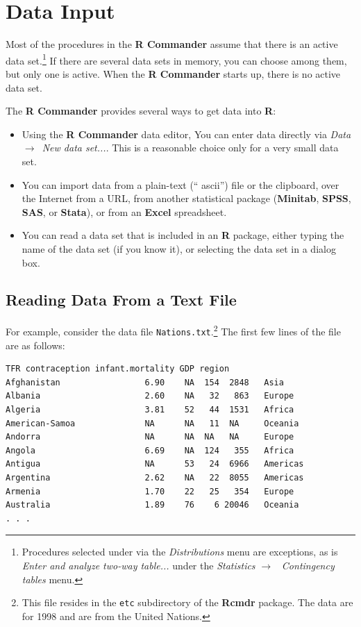 \documentclass{article}%
\begin{document}
\section{Data Input}

Most of the procedures in the \textbf{R Commander} assume that there is an
active data set.\footnote{Procedures selected under via the
\emph{Distributions} menu are exceptions, as is \emph{Enter and analyze
two-way table...} under the \emph{Statistics }$\longrightarrow$%
\emph{\ Contingency tables} menu.} If there are several data sets in memory,
you can choose among them, but only one is active. When the \textbf{R
Commander} starts up, there is no active data set.

The \textbf{R Commander} provides several ways to get data into \textbf{R}:

\begin{itemize}
\item Using the \textbf{R Commander} data editor, You can enter data directly
via \emph{Data }$\longrightarrow$\emph{\ New data set...}. This is a
reasonable choice only for a very small data set.

\item You can import data from a plain-text (\textquotedblleft
ascii\textquotedblright) file or the clipboard, over the Internet from a URL,
from another statistical package (\textbf{Minitab}, \textbf{SPSS},
\textbf{SAS}, or \textbf{Stata}), or from an \textbf{Excel} spreadsheet.

\item You can read a data set that is included in an \textbf{R} package,
either typing the name of the data set (if you know it), or selecting the data
set in a dialog box.
\end{itemize}

\subsection{Reading Data From a Text File}

For example, consider the data file \texttt{Nations.txt}.\footnote{This file
resides in the \texttt{etc} subdirectory of the \textbf{Rcmdr} package. The
data are for 1998 and are from the United Nations.} The first few lines of the
file are as follows:
\begin{verbatim}
TFR contraception infant.mortality GDP region
Afghanistan                 6.90    NA  154  2848   Asia
Albania                     2.60    NA   32   863   Europe
Algeria                     3.81    52   44  1531   Africa
American-Samoa              NA      NA   11  NA     Oceania
Andorra                     NA      NA  NA   NA     Europe
Angola                      6.69    NA  124   355   Africa
Antigua                     NA      53   24  6966   Americas
Argentina                   2.62    NA   22  8055   Americas
Armenia                     1.70    22   25   354   Europe
Australia                   1.89    76    6 20046   Oceania
. . .

\end{verbatim}
\end{document}
